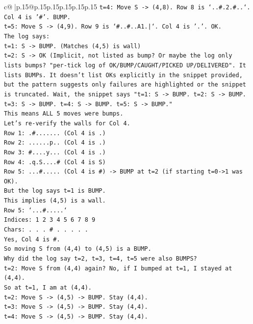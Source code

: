 \documentclass{article}
\begin{document}
{\begin{supertabular}{c@{$\;$}|p{.15\linewidth}@{}p{.15\linewidth}p{.15\linewidth}p{.15\linewidth}p{.15\linewidth}p{.15\linewidth}}
{{{\texttt{t=4: Move S {-}> (4,8). Row 8 is `..\#.2.\#..`. Col 4 is '\#'. BUMP.} \\
\texttt{t=5: Move S {-}> (4,9). Row 9 is `\#..\#..A1.|`. Col 4 is '.'. OK.} \\
\texttt{The log says:} \\
\texttt{t=1: S {-}> BUMP. (Matches (4,5) is wall)} \\
\texttt{t=2: S {-}> OK (Implicit, not listed as bump? Or maybe the log only lists bumps? "per{-}tick log of OK/BUMP/CAUGHT/PICKED UP/DELIVERED". It lists BUMPs. It doesn't list OKs explicitly in the snippet provided, but the pattern suggests only failures are highlighted or the snippet is truncated. Wait, the snippet says "t=1: S {-}> BUMP. t=2: S {-}> BUMP. t=3: S {-}> BUMP. t=4: S {-}> BUMP. t=5: S {-}> BUMP."} \\
\texttt{This means ALL 5 moves were bumps.} \\
\texttt{Let's re{-}verify the walls for Col 4.} \\
\texttt{Row 1: .\#....... (Col 4 is .)} \\
\texttt{Row 2: ......p.. (Col 4 is .)} \\
\texttt{Row 3: \#....y... (Col 4 is .)} \\
\texttt{Row 4: .q.S....\# (Col 4 is S)} \\
\texttt{Row 5: ...\#..... (Col 4 is \#) {-}> BUMP at t=2 (if starting t=0{-}>1 was OK).} \\
\texttt{But the log says t=1 is BUMP.} \\
\texttt{This implies (4,5) is a wall.} \\
\texttt{Row 5: `...\#.....`} \\
\texttt{Indices: 1 2 3 4 5 6 7 8 9} \\
\texttt{Chars: . . . \# . . . . .} \\
\texttt{Yes, Col 4 is \#.} \\
\texttt{So moving S from (4,4) to (4,5) is a BUMP.} \\
\texttt{Why did the log say t=2, t=3, t=4, t=5 were also BUMPS?} \\
\texttt{t=2: Move S from (4,4) again? No, if I bumped at t=1, I stayed at (4,4).} \\
\texttt{So at t=1, I am at (4,4).} \\
\texttt{t=2: Move S {-}> (4,5) {-}> BUMP. Stay (4,4).} \\
\texttt{t=3: Move S {-}> (4,5) {-}> BUMP. Stay (4,4).} \\
\texttt{t=4: Move S {-}> (4,5) {-}> BUMP. Stay (4,4).} \\
}}}
\end{supertabular}}
\end{document}
